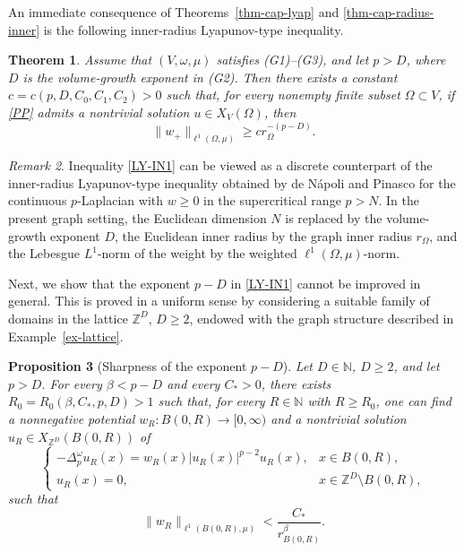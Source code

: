 \documentclass[twoside,12pt,letter]{article}
\theoremstyle{plain}
\newtheorem{theorem}{Theorem}[section]
\newtheorem{proposition}[theorem]{Proposition}
\theoremstyle{definition}
\theoremstyle{remark}
\newtheorem{remark}[theorem]{Remark}
\numberwithin{equation}{section}
\begin{document}
An immediate consequence of Theorems~\ref{thm-cap-lyap} and
\ref{thm-cap-radius-inner} is the following inner-radius Lyapunov-type
inequality.

\begin{theorem}\label{th-inner-radius-lyap}
Assume that \((V,\omega,\mu)\) satisfies {\rm(G1)}--{\rm(G3)}, and let
\(p>D\), where \(D\) is the volume-growth exponent in {\rm(G2)}. Then there
exists a constant \(c=c(p,D,C_0,C_1,C_2)>0\) such that, for every nonempty
finite subset \(\Omega\subset V\), if \eqref{PP} admits a nontrivial solution
\(u\in X_V(\Omega)\), then
\begin{equation}\label{LY-IN1}
\|w_+\|_{\ell^1(\Omega,\mu)}
\ge
c r_\Omega^{-(p-D)}.
\end{equation}
\end{theorem}

\begin{remark}
Inequality \eqref{LY-IN1} can be viewed as a discrete counterpart of the
inner-radius Lyapunov-type inequality obtained by de N\'apoli and Pinasco
\cite{deNapoliPinasco2016} for the continuous \(p\)-Laplacian with
\(w\ge 0\) in the supercritical range \(p>N\). In the present graph setting,
the Euclidean dimension \(N\) is replaced by the volume-growth exponent \(D\),
the Euclidean inner radius by the graph inner radius \(r_\Omega\), and the
Lebesgue \(L^1\)-norm of the weight by the weighted
\(\ell^1(\Omega,\mu)\)-norm.
\end{remark}

Next, we show that the exponent \(p-D\) in \eqref{LY-IN1} cannot be improved
in general. This is proved in a uniform sense by considering a suitable family
of domains in the lattice \(\mathbb{Z}^D\), \(D\ge 2\), endowed with the graph
structure described in Example~\ref{ex-lattice}.

\begin{proposition}[Sharpness of the exponent \(p-D\)]\label{prop-sharp-p>D}
Let \(D\in\mathbb{N}\), \(D\ge 2\), and let \(p>D\). For every
\(\beta<p-D\) and every \(C_*>0\), there exists
\(R_0=R_0(\beta,C_*,p,D)>1\) such that, for every
\(R\in\mathbb{N}\) with \(R\ge R_0\), one can find a nonnegative potential
\(w_R:B(0,R)\to[0,\infty)\) and a nontrivial solution
\(u_R\in X_{\mathbb{Z}^D}(B(0,R))\) of
\[
\left\{
\begin{array}{ll}
-\Delta_p^\omega u_R(x)
=
w_R(x)|u_R(x)|^{p-2}u_R(x), & x\in B(0,R),\\[4pt]
u_R(x)=0, & x\in \mathbb{Z}^D\setminus B(0,R),
\end{array}
\right.
\]
such that
\begin{equation}\label{inv-ineq}
\|w_R\|_{\ell^1(B(0,R),\mu)}
<
\frac{C_*}{r_{B(0,R)}^{\beta}}.
\end{equation}
\end{proposition}
\end{document}
